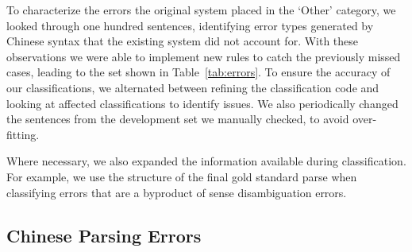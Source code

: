To characterize the errors the original system placed in the `Other' category,
we looked through one hundred sentences, identifying error types generated by
Chinese syntax that the existing system did not account for.
With these observations we were able to implement new rules to catch the
previously missed cases, leading to the set shown in Table~\ref{tab:errors}.
To ensure the accuracy of our classifications, we alternated between refining
the classification code and looking at affected classifications to identify
issues.  We also periodically changed the sentences from the development set
we manually checked, to avoid over-fitting.

Where necessary, we also expanded the information available during
classification.  For example, we use the structure of the final gold standard
parse when classifying errors that are a byproduct of sense disambiguation
errors.

\subsection{Chinese Parsing Errors} \label{sec:chinese_parsing_errors}

